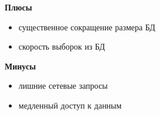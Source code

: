 \begin{frame}
  \bfseries Плюсы
  \normalfont
  \vspace{1em}
  \begin{itemize}[leftmargin=1em,itemsep=0.7em, label=\RNDSmarker]
    \item существенное сокращение размера БД
    \item скорость выборок из БД
  \end{itemize}
  \vspace{2em}
  \bfseries Минусы
  \normalfont
  \vspace{1em}
  \begin{itemize}[leftmargin=1em,itemsep=0.7em, label=\RNDSmarkerGray]
    \item лишние сетевые запросы
    \item медленный доступ к данным
  \end{itemize}
\end{frame}
